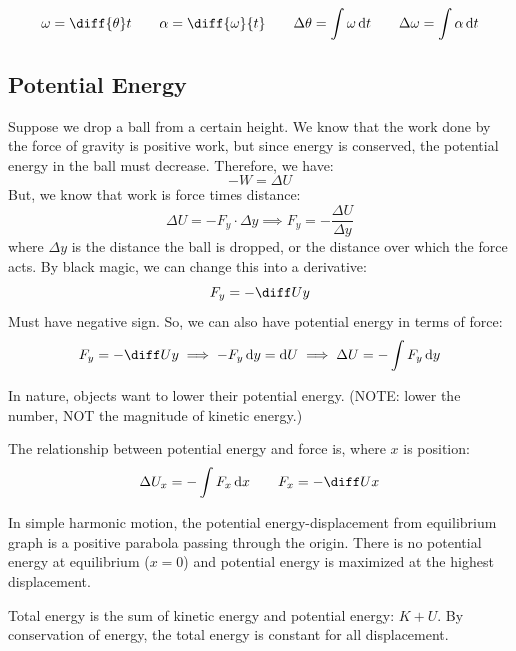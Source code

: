 \documentclass{article}
\newcommand{\theorem}[2]{\begin{tcolorbox}[title={#1},colback=blue!5!white,colframe=blue!75!black,parbox=false] #2 \end{tcolorbox}}
\newcommand{\remark}[2]{\begin{tcolorbox}[title={#1},colback=black!5!white,colframe=black!75!black,parbox=false] #2 \end{tcolorbox}}
\begin{document}
\theorem{Rotational kinematics}{
	\begin{equation*}
		\omega=\diff{\theta}t \qquad
		\alpha=\diff{\omega}{t} \qquad
		\Delta\theta=\int \omega\,\mathrm{d}t \qquad
		\Delta \omega=\int \alpha\,\mathrm{d}t
	\end{equation*}
}

\subsection{Potential Energy}

Suppose we drop a ball from a certain height. We know that the work done by the force of gravity is positive work, but since energy is conserved, the potential energy in the ball must decrease. Therefore, we have:
\begin{equation*}
    -W=\Delta U 
\end{equation*}
But, we know that work is force times distance:
\begin{equation*}
	\Delta U=-F_y\cdot \Delta y
	\implies F_y=-\frac{\Delta U}{\Delta y}
\end{equation*}
where $\Delta y$ is the distance the ball is dropped, or the distance over which the force acts. By black magic, we can change this into a derivative:
\begin{equation*}
	F_y=-\diff Uy
\end{equation*}
Must have negative sign. So, we can also have potential energy in terms of force:
\begin{equation*}
    F_y=-\diff Uy
	\implies -F_y \,\mathrm{d}y=\mathrm{d}U
	\implies \Delta U=-\int F_y\,\mathrm{d}y
\end{equation*}
\remark*{In nature, objects want to lower their potential energy. (NOTE: lower the number, NOT the magnitude of kinetic energy.)}

\theorem{Potential energy}{
	The relationship between potential energy and force is, where $x$ is position:
	\begin{equation*}
	    \Delta U_x=-\int F_x\,\mathrm{d}x
		\qquad
		F_x=-\diff Ux
	\end{equation*}
}

In simple harmonic motion, the potential energy-displacement from equilibrium graph is a positive parabola passing through the origin. There is no potential energy at equilibrium ($x=0$) and potential energy is maximized at the highest displacement.

Total energy is the sum of kinetic energy and potential energy: $K+U$. By conservation of energy, the total energy is constant for all displacement.
\end{document}
